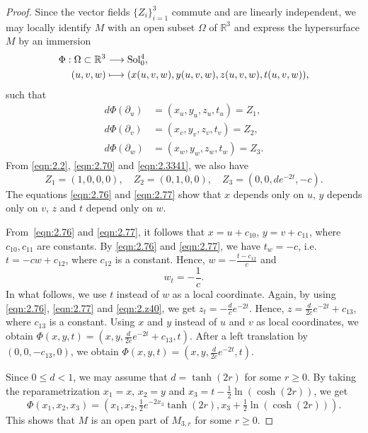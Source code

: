 \documentclass[reqno]{amsart}%
\theoremstyle{definition}
\numberwithin{equation}{section}
\begin{document}
\begin{proof}
		Since the vector fields $\{Z_i\}_{i=1}^3$ commute and are linearly independent, we may locally identify $M$ with an open subset $\Omega$ of $\mathbb{R}^3$
		and express the hypersurface $M$ by an immersion
		\begin{equation*}
			\begin{aligned}
				\Phi:\Omega\subset\mathbb{R}^3 &\longrightarrow {\rm Sol_0^4},\\
				(u,v,w) &\longmapsto (x(u,v,w),y(u,v,w),z(u,v,w),t(u,v,w)),
			\end{aligned}
		\end{equation*}
		such that
		\begin{equation}\label{eqn:2.76}
			\begin{aligned}
				d\Phi(\partial_u)
				&=(x_u,y_u,
				z_u,t_u)=Z_1,\\
				d\Phi(\partial_v)
				&=(x_v,y_v,
				z_v,t_v)=Z_2,\\
				d\Phi(\partial_w)
				&=(x_w,y_w,
				z_w,t_w)=Z_3.
			\end{aligned}
		\end{equation}
		From \eqref{eqn:2.2}, \eqref{eqn:2.70} and \eqref{eqn:2.3341}, we also have
		\begin{equation}\label{eqn:2.77}
			Z_1=(1,0,0,0), \quad Z_2=(0,1,0,0), \quad Z_3=\left(0,0,de^{-2t},-c\right).
		\end{equation}
		The equations \eqref{eqn:2.76} and \eqref{eqn:2.77} show that
		$x$ depends only on $u$, $y$ depends only on $v$, $z$ and $t$ depend only on $w$.
		
		From~\eqref{eqn:2.76} and \eqref{eqn:2.77}, it follows that
		$x=u+c_{10}$, $y=v+c_{11}$,
		where $c_{10}, c_{11}$ are constants.
		By \eqref{eqn:2.76} and \eqref{eqn:2.77}, we have $t_w=-c$, i.e.\ $t=-cw+c_{12}$, where $c_{12}$ is a constant.
		Hence,
		$w=-\tfrac{t-c_{12}}{c}$ and
		\begin{equation}\label{eqn:2.z40}
			w_t=-\frac{1}{c}.
		\end{equation}
		In what follows, we use $t$ instead of $w$ as a local coordinate.
		Again, by using \eqref{eqn:2.76}, \eqref{eqn:2.77} and \eqref{eqn:2.z40}, we get
		$z_t=-\tfrac{d}{c}e^{-2t}$. Hence,
		$z=\tfrac{d}{2c}e^{-2t}+c_{13}$, where $c_{13}$ is a constant.	
		Using $x$ and $y$ instead of $u$ and $v$ as local coordinates,
		we obtain
		$\Phi(x,y,t)= \left(x,y,\tfrac{d}{2c}e^{-2t}+c_{13},t\right)$.
		After a left translation by $(0,0,-c_{13},0)$,
		we obtain
		$
		\Phi(x,y,t)=\left(x,y,\tfrac{d}{2c}e^{-2t},t\right).
		$
		
		Since $0\leq d<1$, we may assume that $d=\tanh (2r)$ for some $r\geq0$.
		By taking the reparametrization $x_1=x$, $x_2=y$ and
		$x_3=t-\tfrac{1}{2}\ln(\cosh(2r))$, we get
		$$
		\Phi(x_1,x_2,x_3)=(x_1,x_2,\tfrac{1}{2}e^{-2x_3}\tanh(2r),x_3+\tfrac{1}{2}\ln(\cosh(2r))).
		$$
		This shows that $M$ is an open part of $M_{3,r}$ for some $r\geq0$.
	\end{proof}
	
\end{document}
